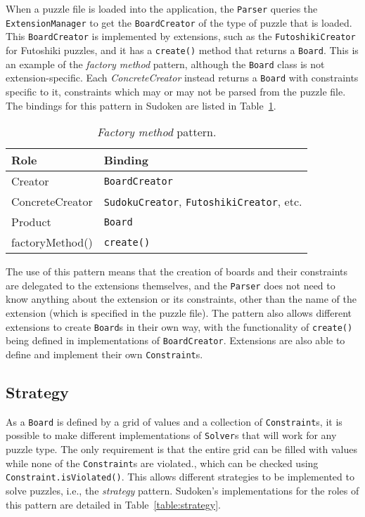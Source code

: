 \documentclass[a4paper, 11pt]{article}
\begin{document}
When a puzzle file is loaded into the application, the \texttt{Parser} queries the \texttt{ExtensionManager} to get the \texttt{BoardCreator} of the type of puzzle that is loaded. This \texttt{BoardCreator} is implemented by extensions, such as the \texttt{FutoshikiCreator} for Futoshiki puzzles, and it has a \texttt{create()} method that returns a \texttt{Board}. This is an example of the \textit{factory method} pattern, although the \texttt{Board} class is not extension-specific. Each \textit{ConcreteCreator} instead returns a \texttt{Board} with constraints specific to it, constraints which may or may not be parsed from the puzzle file. The bindings for this pattern in Sudoken are listed in Table~\ref{table:factory}.

\begin{table}[h!]
\centering
\begin{tabular}{l l}
\textbf{Role}   & \textbf{Binding} \\ \hline
Creator         & \texttt{BoardCreator} \\
ConcreteCreator & \texttt{SudokuCreator}, \texttt{FutoshikiCreator}, etc. \\
Product         & \texttt{Board} \\
factoryMethod() & \texttt{create()} \\
\end{tabular}
\caption{\textit{Factory method} pattern.}
\label{table:factory}
\end{table}

The use of this pattern means that the creation of boards and their constraints are delegated to the extensions themselves, and the \texttt{Parser} does not need to know anything about the extension or its constraints, other than the name of the extension (which is specified in the puzzle file). The pattern also allows different extensions to create \texttt{Board}s in their own way, with the functionality of \texttt{create()} being defined in implementations of \texttt{BoardCreator}. Extensions are also able to define and implement their own \texttt{Constraint}s.

\subsection{Strategy}

As a \texttt{Board} is defined by a grid of values and a collection of \texttt{Constraint}s, it is possible to make different implementations of \texttt{Solver}s that will work for any puzzle type. The only requirement is that the entire grid can be filled with values while none of the \texttt{Constraint}s are violated., which can be checked using \texttt{Constraint.isViolated()}. This allows different strategies to be implemented to solve puzzles, i.e., the \textit{strategy} pattern. Sudoken's implementations for the roles of this pattern are detailed in Table~\ref{table:strategy}.
\end{document}
